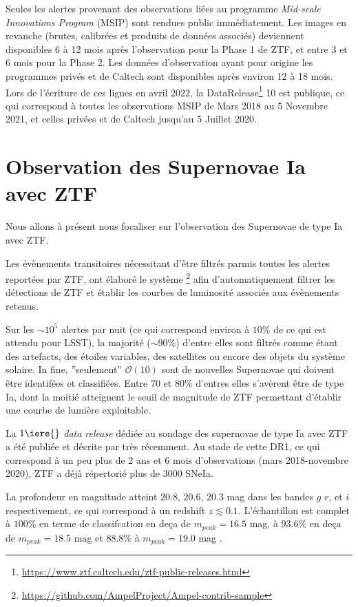 \documentclass[../main/main.tex]{subfiles}
\begin{document}
Seules les alertes provenant des observations liées au programme \textit{Mid-scale
Innovations Program} (MSIP)
sont rendues public immédiatement. Les images en revanche (brutes,
calibrées et produits de données associés) deviennent disponibles 6 à 12 mois 
après l'observation pour la Phase 1 de ZTF, et entre 3 et 6 mois pour la
Phase 2. Les données d'observation ayant pour origine les programmes
privés et de Caltech sont disponibles après environ 12 à 18 mois. Lors
de l'écriture de ces lignes en avril 2022, la
DataRelease\footnote{\url{https://www.ztf.caltech.edu/ztf-public-releases.html}}
10 est publique, ce qui correspond à toutes les observations MSIP de Mars 2018 au 5 Novembre
2021, et celles privées et de Caltech jusqu'au 5 Juillet 2020.

\section{Observation des Supernovae Ia avec ZTF}\label{sec:sniaztf}

Nous allons à présent nous focaliser sur l'observation des Supernovae de
type Ia avec ZTF.

Les évènements transitoires nécessitant d'être filtrés parmis toutes les
alertes reportées par ZTF, \citet{NordinAMPEL2019} ont élaboré le système
\footnote{\url{https://github.com/AmpelProject/Ampel-contrib-sample}} afin d'automatiquement filtrer
les détections de ZTF et établir les courbes de luminosité associés aux
évènements retenus.

Sur les $\sim 10^{5}$ alertes par nuit (ce qui correspond environ à
$10\%$ de ce qui est attendu pour LSST), la majorité ($\sim 90\%$)
d'entre elles sont filtrés comme étant des artefacts, des étoiles
variables, des satellites ou encore des objets du système solaire. In
fine, ''seulement'' $\mathcal{O}(10)$ sont de nouvelles Supernovae qui
doivent être identifées et classifiées. Entre $70$ et $80\%$ d'entres
elles s'avèrent être de type Ia, dont la moitié atteignent le seuil de
magnitude de ZTF permettant d'établir une courbe de lumière
exploitable.

La $1\iere{}$ \textit{data release} dédiée au sondage des supernovae de type Ia
avec ZTF a été publiée et décrite par \citet{DhawanZTFDR1} très
récemment. Au stade de cette DR1, ce qui correspond à un peu plus de 2
ans et 6 mois d'observations (mars 2018-novembre 2020), ZTF a déjà
répertorié plus de $3000$ SNeIa.

La profondeur en magnitude atteint
$20.8$, $20.6$, $20.3$ mag dans les bandes $g$ $r$, et $i$ respectivement, ce qui
correspond à un redshift $z\lesssim0.1$. L'échantillon est complet à
$100\%$ en terme de classifcation en deça de $m_{peak}=16.5$ mag, à
$93.6\%$ en deça de $m_{peak}=18.5$ mag et $88.8\%$ à $m_{peak}=19.0$
mag \citep{FremlingZTFspec2020}.
\end{document}
